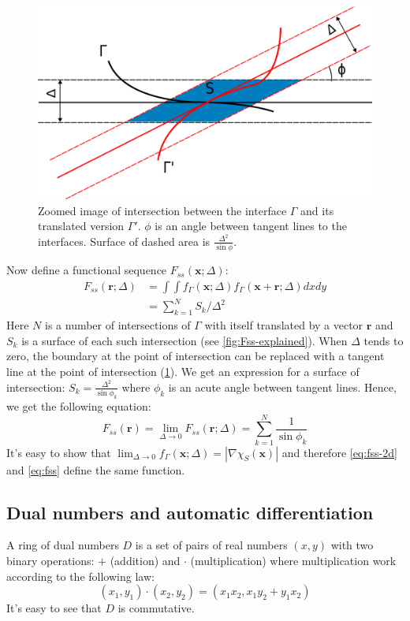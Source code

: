 \documentclass[reprint,amsmath,amssymb,aps,pre,showkeys,showpacs]{revtex4-1}
\begin{document}
\begin{figure}
  \centering
  \includegraphics[width=0.8\linewidth]{images/fss-zoomed.png}
  \caption[]{Zoomed image of intersection between the interface $\Gamma$ and its
    translated version $\Gamma'$. $\phi$ is an angle between tangent lines to
    the interfaces. Surface of dashed area is $\frac{\Delta^2}{\sin \phi}$.}
  \label{fig:fss-zoomed}
\end{figure}
Now define a functional sequence $F_{ss}(\bm{x}; \Delta)$:
\begin{align*}
  F_{ss}(\bm{r}; \Delta) &= \int\int f_\Gamma(\bm{x}; \Delta) f_\Gamma(\bm{x}
  + \bm{r}; \Delta) dx dy \\
  &= \sum_{k=1}^N S_k/\Delta^2
\end{align*}
Here $N$ is a number of intersections of $\Gamma$ with itself translated by a
vector $\bm{r}$ and $S_k$ is a surface of each such intersection (see
\cref{fig:Fss-explained}).
When $\Delta$ tends to zero, the boundary at the point of intersection can
be replaced with a tangent line at the point of intersection
(\cref{fig:fss-zoomed}). We get an expression for a surface of
intersection: $S_k = \frac{\Delta^2}{\sin \phi_k}$ where $\phi_k$ is an
acute angle between tangent lines. Hence, we get the following equation:
\begin{equation}
  F_{ss}(\bm{r}) = \lim_{\Delta \to 0} F_{ss}(\bm{r}; \Delta) =
  \sum_{k=1}^N \frac{1}{\sin \phi_k} \label{eq:fss-2d}
\end{equation}
It's easy to show that
$\lim_{\Delta \to 0} f_\Gamma(\bm{x}; \Delta) = |\nabla \chi_S(\bm{x})|$
and therefore \cref{eq:fss-2d} and \cref{eq:fss} define the same function.

\subsection{Dual numbers and automatic differentiation}
\label{sec:dual}
A ring of dual numbers $D$ is a set of pairs of real numbers $(x, y)$ with two
binary operations: $+$ (addition) and $\cdot$ (multiplication) where
multiplication work according to the following law:
\begin{equation*}
  (x_1, y_1)\cdot(x_2, y_2) = (x_1x_2, x_1y_2 + y_1x_2)
\end{equation*}
It's easy to see that $D$ is commutative.
\end{document}
